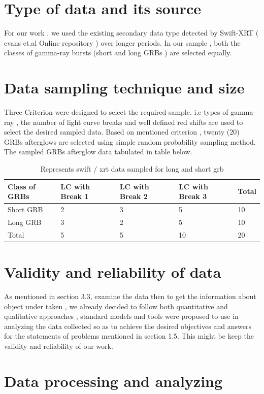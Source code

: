 \section{Type of data  and its source }
For  our  work , we  used   the   existing  secondary   data  type  detected by  Swift-XRT   ( evans et.al   Online  repository )  over  longer  periods. In our sample , both  the   classes   of  gamma-ray   bursts  (short  and  long  GRBs )  are  selected equally. 
\section{Data sampling technique and size}
Three   Criterion  were  designed   to   select   the  required   sample. i.e  types of  gamma-ray   , the   number  of   light  curve   breaks   and  well  defined  red shifts   are   used   to   select   the   desired   sampled  data.  Based  on mentioned   criterion ,  twenty  (20)  GRBs   afterglows   are   selected   using  simple   random   probability   sampling   method. The   sampled   GRBs   afterglow  data   tabulated in table  below.
\begin{center}
\begin{table}
\caption{\label{tab:"Table 3.1: " } Represents    swift / xrt  data sampled  for  long and short  grb   }
\begin{tabular}{|l|l|l|l|l|} 
\hline
Class of GRBs & LC with Break 1 & LC with Break 2 & LC with Break 3 & Total \\ \hline
Short GRB & 2 & 3 & 5 & 10 \\ \hline
Long GRB & 3 & 2 & 5 & 10 \\ \hline
Total & 5 & 5 & 10 & 20 \\ \hline 
\end{tabular}
\end{table}
\end{center}
\section{Validity and reliability of data }
 As mentioned in section 3.3, examine the data then to get the information about object under taken , we already decided to follow both quantitative and qualitative approaches , standard models and tools were  proposed  to use in analyzing the data collected so as to achieve the desired  objectives and  answers  for the  statements of problems mentioned in section 1.5. This might be  keep the validity and reliability of our work.
\section{Data processing and analyzing} 
